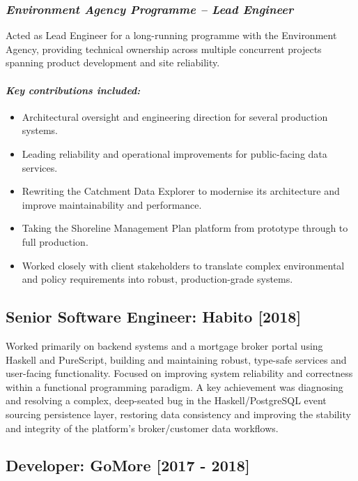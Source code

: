 \documentclass{article}
\begin{document}
\subsubsection*{\emph{Environment Agency Programme – Lead Engineer}}
Acted as Lead Engineer for a long-running programme with the Environment
     Agency, providing technical ownership across multiple concurrent projects
     spanning product development and site reliability.
\paragraph*{\emph{Key contributions included:}}
\begin{itemize}
\item Architectural oversight and engineering direction for several production systems.
\item Leading reliability and operational improvements for public-facing data services.
\item Rewriting the Catchment Data Explorer to modernise its architecture and improve maintainability and performance.
\item Taking the Shoreline Management Plan platform from prototype through
           to full production.
\item Worked closely with client stakeholders to translate complex
           environmental and policy requirements into robust, production-grade
           systems.
\end{itemize}
\subsection*{Senior Software Engineer: Habito [2018]}
Worked primarily on backend systems and a mortgage broker portal using
      Haskell and PureScript, building and maintaining robust, type-safe
      services and user-facing functionality. Focused on improving system
      reliability and correctness within a functional programming paradigm.
A key achievement was diagnosing and resolving a complex, deep-seated bug
      in the Haskell/PostgreSQL event sourcing persistence layer, restoring data
      consistency and improving the stability and integrity of the platform’s
      broker/customer data workflows.
\subsection*{Developer: GoMore [2017 - 2018]}
\end{document}

